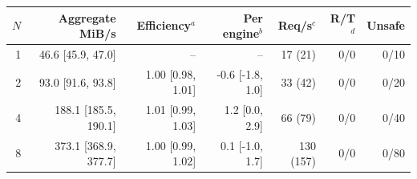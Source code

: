 
\begin{tabular}{@{}rrrrrrr@{}}
\toprule
$N$ & Aggregate MiB/s & Efficiency$^a$ & Per engine$^b$ & Req/s$^c$ & R/T$^d$ & Unsafe \\
\midrule
1 & 46.6 [45.9, 47.0] & -- & -- & 17 (21) & 0/0 & 0/10 \\
2 & 93.0 [91.6, 93.8] & 1.00 [0.98, 1.01] & -0.6 [-1.8, 1.0] & 33 (42) & 0/0 & 0/20 \\
4 & 188.1 [185.5, 190.1] & 1.01 [0.99, 1.03] & 1.2 [0.0, 2.9] & 66 (79) & 0/0 & 0/40 \\
8 & 373.1 [368.9, 377.7] & 1.00 [0.99, 1.02] & 0.1 [-1.0, 1.7] & 130 (157) & 0/0 & 0/80 \\
\bottomrule
\end{tabular}
